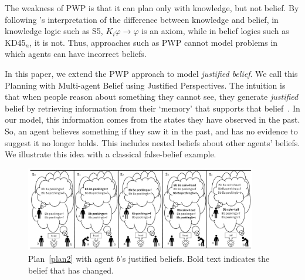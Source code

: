 The weakness of PWP is that it can plan only with knowledge, but not belief.
By following \citeauthor{Fagin:2003:RK:995831}'s  interpretation of the difference between knowledge and belief, in knowledge logic such as S5, $K_i \varphi \rightarrow \varphi$ is an axiom, while in belief logics such as KD45$_n$, it is not. Thus, approaches such as PWP cannot model problems in which agents can have incorrect beliefs.

In this paper, we extend the PWP approach to model \emph{justified belief}. We call this Planning with Multi-agent Belief using Justified Perspectives.
The intuition is that when people reason about something they cannot see, they generate \emph{justified} belief by retrieving information from their `memory' that supports that belief~\cite{goldman1979justified}. 
In our model, this information comes from the states they have observed in the past. 
So, an agent believes something if they saw it in the past, and has no evidence to suggest it no longer holds. 
This includes nested beliefs about other agents' beliefs.
We illustrate this idea with a classical false-belief example. 
\begin{figure}[t!]
    \centering
    \includegraphics[width=0.9\textwidth]{Figures/plan_2_final.jpg}
    \caption{Plan~\ref{plan2} with agent $b$'s justified beliefs. Bold text indicates the belief that has changed.}
    \label{fig:plan_2_final}
\end{figure}

